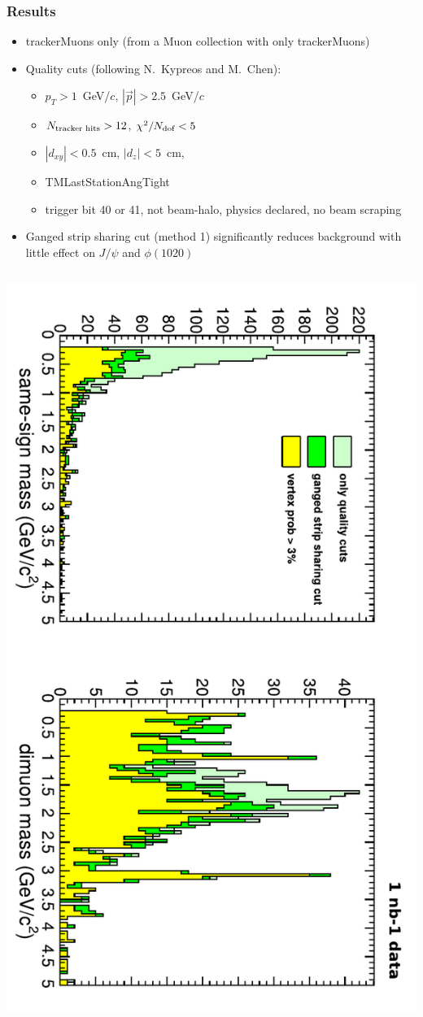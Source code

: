 \documentclass[compress]{beamer}
\begin{document}
\begin{frame}
\frametitle{Results}

\begin{itemize}
\item trackerMuons only (from a Muon collection with only trackerMuons)

\item Quality cuts (following N.\ Kypreos and M.\ Chen):
\begin{itemize}\setlength{\itemsep}{0.1 cm}
\item \scriptsize  $p_T > 1$~GeV/$c$, $|\vec{p}| > 2.5$~GeV/$c$
\item \scriptsize $N_{\mbox{\scriptsize tracker hits}} > 12$, $\chi^2/N_{\mbox{\scriptsize dof}} < 5$
\item \scriptsize $|d_{xy}| < 0.5$~cm, $|d_{z}| < 5$~cm, 
\item \scriptsize TMLastStationAngTight
\item \scriptsize trigger bit 40 or 41, not beam-halo, physics declared, no beam scraping
\end{itemize}

\item Ganged strip sharing cut (method 1) significantly reduces background with little effect on $J/\psi$ and $\phi(1020)$
\end{itemize}

\begin{columns}
\includegraphics[height=\linewidth, angle=90]{gangedstripcut_mass.pdf}


\end{columns}
\end{frame}
\end{document}
